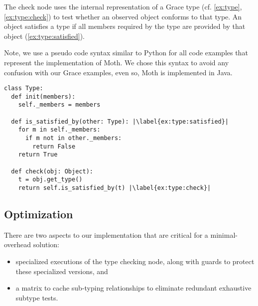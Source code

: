 
%

The check node uses the internal representation of a Grace type
(cf. \cref{ex:type}, \cref{ex:type:check}) to test whether an observed
object conforms to that type. 
An object satisfies a type if all members required by the type are provided
by that object (\cref{ex:type:satisfied}).

Note, we use a pseudo code syntax similar to Python for all code examples
that represent the implementation of Moth.
We chose this syntax to avoid any confusion with our Grace examples,
even so, Moth is implemented in Java.


\begin{lstlisting}[label={ex:type},escapechar=|,%
  caption={Sketch of a \code{Type} in our system and its \code{check()} semantics.},%
  float,floatplacement=htb,columns=flexible,float,floatplacement=H,morekeywords={not}]
class Type:
  def init(members):
    self._members = members

  def is_satisfied_by(other: Type): |\label{ex:type:satisfied}|
    for m in self._members:
      if m not in other._members:
        return False
    return True

  def check(obj: Object):
    t = obj.get_type()
    return self.is_satisfied_by(t) |\label{ex:type:check}|
\end{lstlisting}


\subsection{Optimization}
\label{ssec:optimization}

There are two aspects to our implementation that are critical for a minimal-overhead solution:

\begin{itemize}
  \item specialized executions of the type checking node, along with guards to protect these specialized versions, and
  \item a matrix to cache sub-typing relationships to eliminate
    redundant exhaustive subtype tests.
\end{itemize}
 

